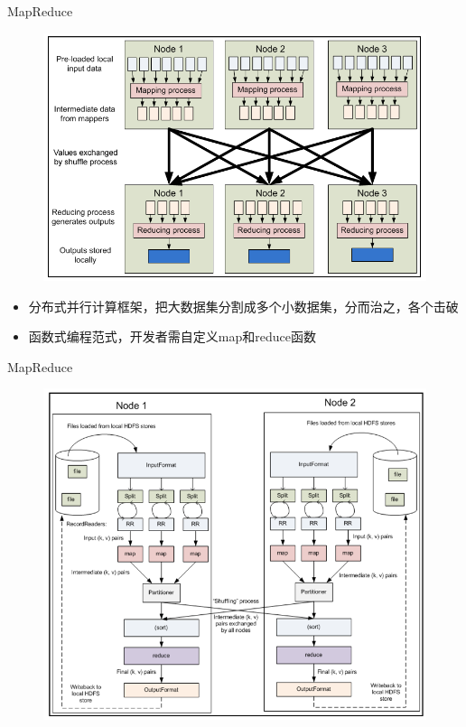 \documentclass{beamer}
\begin{document}
\begin{frame}{MapReduce}

\begin{figure}
\includegraphics[width=0.75\linewidth]{./MapReduce_1}
\end{figure}

\vspace{-1em}

\begin{itemize}
\item 分布式并行计算框架，把大数据集分割成多个小数据集，分而治之，各个击破
\item 函数式编程范式，开发者需自定义map和reduce函数
\end{itemize}

\end{frame}

\begin{frame}{MapReduce}

\begin{figure}
\includegraphics[width=0.95\linewidth]{./MapReduce_2}
\end{figure}

\end{frame}
\end{document}

